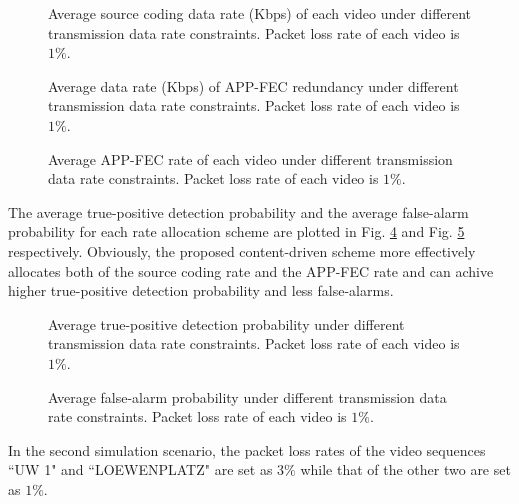 \documentclass[journal]{IEEEtran}
\begin{document}
\begin{figure}[t]
\caption{Average source coding data rate (Kbps) of each video under different transmission data rate constraints. Packet loss rate of each video is $1\%$.}\label{fig:avg_dataRate_1}
\end{figure}

\begin{figure}[t]
\caption{Average data rate (Kbps) of APP-FEC redundancy under different transmission data rate constraints. Packet loss rate of each video is $1\%$.}\label{fig:avg_fec_redundancy_rate_1}
\end{figure}

\begin{figure}[t]
\caption{Average APP-FEC rate of each video under different transmission data rate constraints. Packet loss rate of each video is $1\%$.}\label{fig:avg_fec_rate_1}
\end{figure}

The average true-positive detection probability and the average false-alarm probability for each rate allocation scheme are plotted in Fig. \ref{fig:true_positive_1} and Fig. \ref{fig:false_alarm_1} respectively. Obviously, the proposed content-driven scheme more effectively allocates both of the source coding rate and the APP-FEC rate and can achive higher true-positive detection probability and less false-alarms.

\begin{figure}[t]
\caption{Average true-positive detection probability under different transmission data rate constraints. Packet loss rate of each video is $1\%$.}\label{fig:true_positive_1}
\end{figure}

\begin{figure}[t]
\caption{Average false-alarm probability under different transmission data rate constraints. Packet loss rate of each video is $1\%$.}\label{fig:false_alarm_1}
\end{figure}

In the second simulation scenario, the packet loss rates of the video sequences ``UW 1" and ``LOEWENPLATZ" are set as $3\%$ while that of the other two are set as $1\%$.
\end{document}
